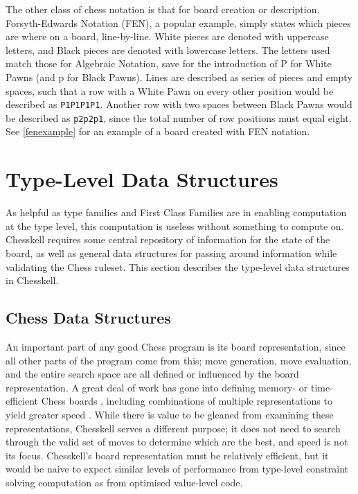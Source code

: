 \documentclass[12pt, a4paper, bibliography=totocnumbered]{scrreprt}
\begin{document}
The other class of chess notation is that for board creation or description. Forsyth-Edwards Notation (FEN), a popular example, simply states which pieces are where on a board, line-by-line. White pieces are denoted with uppercase letters, and Black pieces are denoted with lowercase letters. The letters used match those for Algebraic Notation, save for the introduction of P for White Pawns (and p for Black Pawns). Lines are described as series of pieces and empty spaces, such that a row with a White Pawn on every other position would be described as \texttt{P1P1P1P1}. Another row with two spaces between Black Pawns would be described as \texttt{p2p2p1}, since the total number of row positions must equal eight. See \cref{fenexample} for an example of a board created with FEN notation.

\section{Type-Level Data Structures}

As helpful as type families and First Class Families are in enabling computation at the type level, this computation is useless without something to compute on. Chesskell requires some central repository of information for the state of the board, as well as general data structures for passing around information while validating the Chess ruleset. This section describes the type-level data structures in Chesskell.

\subsection{Chess Data Structures}

An important part of any good Chess program is its board representation, since all other parts of the program come from this; move generation, move evaluation, and the entire search space are all defined or influenced by the board representation. A great deal of work has gone into defining memory- or time-efficient Chess boards \cite{bitboard} \cite{searchtables}, including combinations of multiple representations to yield greater speed \cite{bitandccr}. While there is value to be gleaned from examining these representations, Chesskell serves a different purpose; it does not need to search through the valid set of moves to determine which are the best, and speed is not its focus. Chesskell's board representation must be relatively efficient, but it would be naive to expect similar levels of performance from type-level constraint solving computation as from optimised value-level code.
\end{document}

